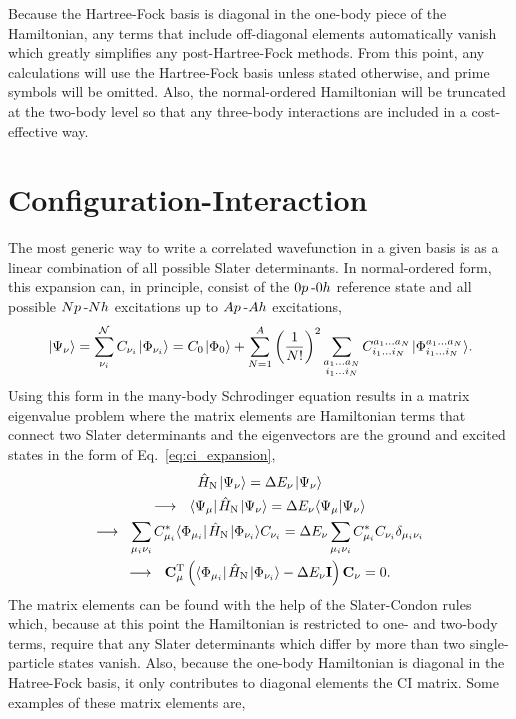 \documentclass[thesis.tex]{subfiles}
\begin{document}
Because the Hartree-Fock basis is diagonal in the one-body piece of the Hamiltonian, any terms that include off-diagonal elements automatically vanish which greatly simplifies any post-Hartree-Fock methods.  From this point, any calculations will use the Hartree-Fock basis unless stated otherwise, and prime symbols will be omitted.  Also, the normal-ordered Hamiltonian will be truncated at the two-body level so that any three-body interactions are included in a cost-effective way.


\section{Configuration-Interaction}
The most generic way to write a correlated wavefunction in a given basis is as a linear combination of all possible Slater determinants.  In normal-ordered form, this expansion can, in principle, consist of the $0p\hspace{2pt}\text{-}0h$ reference state and all possible $Np\hspace{2pt}\text{-}Nh$ excitations up to $Ap\hspace{2pt}\text{-}Ah$ excitations,
\begin{equation} \label{eq:ci_expansion}
  \hspace{1pt}\lvert \Psi_{\nu} \rangle = \sum_{\nu_{i}}^{\mathcal{N}}C_{\nu_{i}}\hspace{1pt}\lvert \Phi_{\nu_{i}} \rangle = C_{0}\hspace{1pt}\lvert \Phi_{0} \rangle + \sum_{N=1}^{A}\left(\frac{1}{N!}\right)^2 \sum_{\substack{a_{1} \ldots a_{N} \\ i_{1} \ldots i_{N}}} C^{a_{1} \ldots a_{N}}_{i_{1} \ldots i_{N}}\hspace{1pt}\lvert \Phi^{a_{1} \ldots a_{N}}_{i_{1} \ldots i_{N}} \rangle.
\end{equation}
Using this form in the many-body Schrodinger equation results in a matrix eigenvalue problem where the matrix elements are Hamiltonian terms that connect two Slater determinants and the eigenvectors are the ground and excited states in the form of Eq.\ \eqref{eq:ci_expansion},
\begin{gather}
  \HamN\ket{\Psi_{\nu}} = \Ecorr_{\nu}\ket{\Psi_{\nu}} \notag \\
  \longrightarrow\ \ \element{\Psi_{\mu}}{\HamN}{\Psi_{\nu}} = \Ecorr_{\nu}\braket{\Psi_{\mu}}{\Psi_{\nu}} \notag \\
  \longrightarrow\ \ \sum_{\mathclap{\mu_{i}\nu_{i}}}C^{*}_{\mu_{i}}\element{\Phi_{\mu_{i}}}{\HamN}{\Phi_{\nu_{i}}}C_{\nu_{i}} = \Ecorr_{\nu}\sum_{\mathclap{\mu_{i}\nu_{i}}}C^{*}_{\mu_{i}}C_{\nu_{i}}\delta_{\mu_{i}\nu_{i}} \notag \\
  \longrightarrow\ \ \mathbf{C}^{\text{T}}_{\mu}\left(\element{\Phi_{\mu_{i}}}{\HamN}{\Phi_{\nu_{i}}} - \Ecorr_{\nu}\mathbf{I}\right)\mathbf{C}_{\nu} = 0.
\end{gather}
The matrix elements can be found with the help of the Slater-Condon rules which, because at this point the Hamiltonian is restricted to one- and two-body terms, require that any Slater determinants which differ by more than two single-particle states vanish.  Also, because the one-body Hamiltonian is diagonal in the Hatree-Fock basis, it only contributes to diagonal elements the CI matrix.  Some examples of these matrix elements are,
\end{document}
